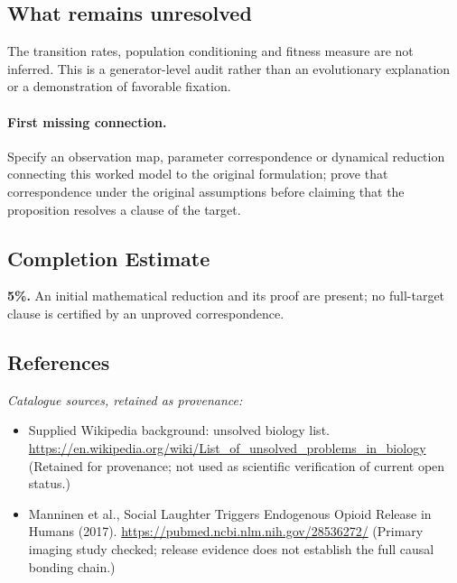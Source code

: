 \documentclass[11pt]{article}
\begin{document}
\subsection{What remains unresolved}
The transition rates, population conditioning and fitness measure are not inferred. This is a generator-level audit rather than an evolutionary explanation or a demonstration of favorable fixation.
\paragraph{First missing connection.} Specify an observation map, parameter correspondence or dynamical reduction connecting this worked model to the original formulation; prove that correspondence under the original assumptions before claiming that the proposition resolves a clause of the target.
\subsection{Completion Estimate}
\textbf{5\%.} An initial mathematical reduction and its proof are present; no full-target clause is certified by an unproved correspondence.
\subsection{References}
\noindent\emph{Catalogue sources, retained as provenance:}
\begin{itemize}
\item Supplied Wikipedia background: unsolved biology list. \url{https://en.wikipedia.org/wiki/List_of_unsolved_problems_in_biology} (Retained for provenance; not used as scientific verification of current open status.)
\item Manninen et al., Social Laughter Triggers Endogenous Opioid Release in Humans (2017). \url{https://pubmed.ncbi.nlm.nih.gov/28536272/} (Primary imaging study checked; release evidence does not establish the full causal bonding chain.)
\end{itemize}
\clearpage


\appendix
\end{document}
